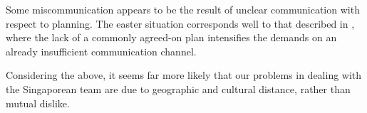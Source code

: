 Some miscommunication appears to be the result of unclear communication with
respect to planning. The easter situation corresponds well to that described in
\cite[sec.~3.1.2]{herbsiemens}, where the lack of a commonly agreed-on plan
intensifies the demands on an already insufficient communication channel.

Considering the above, it seems far more likely that our problems in dealing
with the Singaporean team are due to geographic and cultural distance, rather
than mutual dislike.
